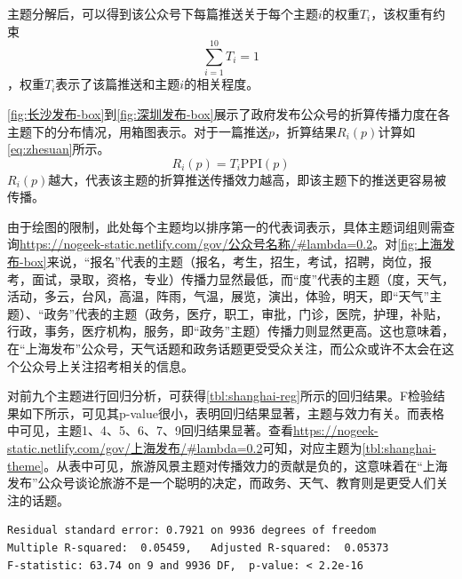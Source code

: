 \documentclass[a4paper,12pt,UTF8]{article}
\begin{document}
    主题分解后，可以得到该公众号下每篇推送关于每个主题$i$的权重$T_i$，该权重有约束$$\sum_{i=1}^{10}T_i=1$$，权重$T_i$表示了该篇推送和主题$i$的相关程度。

    \cref{fig:长沙发布-box}到\cref{fig:深圳发布-box}展示了政府发布公众号的折算传播力度在各主题下的分布情况，用箱图表示。对于一篇推送$p$，折算结果$R_i(p)$计算如\cref{eq:zhesuan}所示。
    \begin{equation}
      \label{eq:zhesuan}
      R_i(p) = T_i\text{PPI}(p)
    \end{equation}
    $R_i(p)$越大，代表该主题的折算推送传播效力越高，即该主题下的推送更容易被传播。
    
    由于绘图的限制，此处每个主题均以排序第一的代表词表示，具体主题词组则需查询\url{https://nogeek-static.netlify.com/gov/公众号名称/#lambda=0.2}。对\cref{fig:上海发布-box}来说，“报名”代表的主题（报名，考生，招生，考试，招聘，岗位，报考，面试，录取，资格，专业）传播力显然最低，而“度”代表的主题（度，天气，活动，多云，台风，高温，阵雨，气温，展览，演出，体验，明天，即“天气”主题）、“政务”代表的主题（政务，医疗，职工，审批，门诊，医院，护理，补贴，行政，事务，医疗机构，服务，即“政务”主题）传播力则显然更高。这也意味着，在“上海发布”公众号，天气话题和政务话题更受受众关注，而公众或许不太会在这个公众号上关注招考相关的信息。

    对前九个主题进行回归分析，可获得\cref{tbl:shanghai-reg}所示的回归结果。F检验结果如下所示，可见其p-value很小，表明回归结果显著，主题与效力有关。而表格中可见，主题1、4、5、6、7、9回归结果显著。查看\url{https://nogeek-static.netlify.com/gov/上海发布/#lambda=0.2}可知，对应主题为\cref{tbl:shanghai-theme}。从表中可见，旅游风景主题对传播效力的贡献是负的，这意味着在“上海发布”公众号谈论旅游不是一个聪明的决定，而政务、天气、教育则是更受人们关注的话题。
    \begin{lstlisting}
Residual standard error: 0.7921 on 9936 degrees of freedom
Multiple R-squared:  0.05459,	Adjusted R-squared:  0.05373 
F-statistic: 63.74 on 9 and 9936 DF,  p-value: < 2.2e-16
    \end{lstlisting}
    
\end{document}
